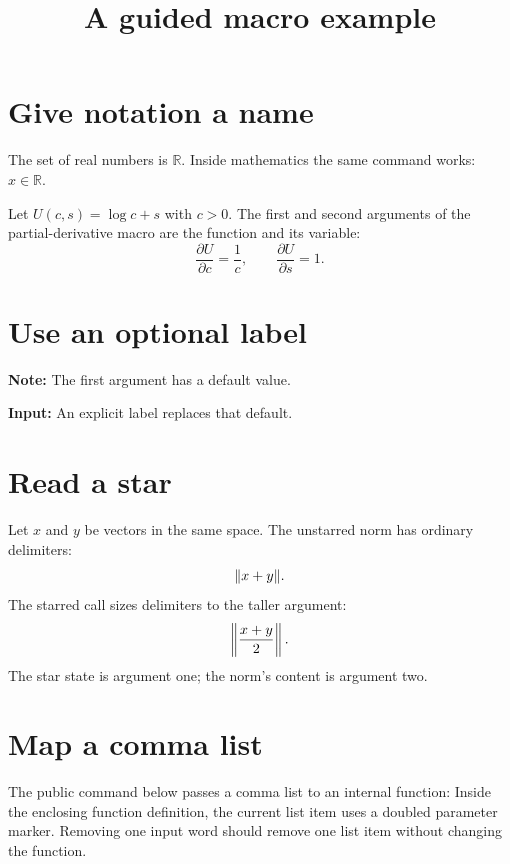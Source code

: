 \documentclass[11pt]{article}
\newcommand{\AtelierReals}{\ensuremath{\mathbb{R}}}
\newcommand{\AtelierPartial}[2]{\frac{\partial #1}{\partial #2}}
\newcommand{\AtelierNote}[2][Note]{\textbf{#1:} #2}
\begin{document}
\title{A guided macro example}
\author{}
\date{}
\maketitle
\section{Give notation a name}
The set of real numbers is \AtelierReals.
Inside mathematics the same command works: $x\in\AtelierReals$.

Let $U(c,s)=\log c+s$ with $c>0$. The first and second arguments
of the partial-derivative macro are the function and its variable:
\[
\AtelierPartial{U}{c}=\frac{1}{c},
\qquad
\AtelierPartial{U}{s}=1.
\]

\section{Use an optional label}
\AtelierNote{The first argument has a default value.}

\AtelierNote[Input]{An explicit label replaces that default.}

\section{Read a star}
Let $x$ and $y$ be vectors in the same space.
The unstarred norm has ordinary delimiters:
\[
\AtelierNorm{x+y}.
\]
The starred call sizes delimiters to the taller argument:
\[
\AtelierNorm*{\frac{x+y}{2}}.
\]
The star state is argument one; the norm's content is argument two.

\section{Map a comma list}
The public command below passes a comma list to an internal function:
Inside the enclosing function definition, the current list item
uses a doubled parameter marker. Removing one input word should
remove one list item without changing the function.
\end{document}
